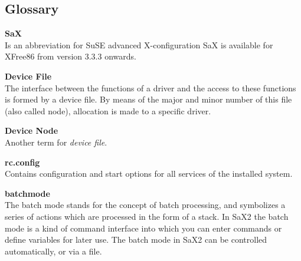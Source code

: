 \begin{twocolumn}
\setcounter{secnumdepth}{-1}
\chapter{Glossary}

\begin{description}

\begin{small}
\item {\textbf{SaX}\\} {
  Is an abbreviation for SuSE advanced X-configuration
  SaX is available for XFree86 from version 3.3.3 onwards.
}

\item {\textbf{Device File}\\} {
  The interface between the functions of a driver and the access to these
  \linebreak functions is formed by a device file. By means of the major and
  minor number of this file (also called node), allocation is made to a
  specific driver.  
}

\item {\textbf{Device Node}\\} {
  Another term for \textit{device file}.
}

\item {\textbf{rc.config}\\} {
  Contains configuration and start options for all services of the installed
  system. 
}

\item {\textbf{batchmode}\\} {
  The batch mode stands for the concept of batch processing, and symbolizes a
  series of actions which are processed in the form of a stack. In SaX2 the 
  batch mode is a kind of command interface into which you can enter commands
  or define variables for later use. The batch mode in SaX2 can be controlled
  automatically, or via a file.  
}

\end{small}
\end{description}
\end{twocolumn}


\onecolumn


